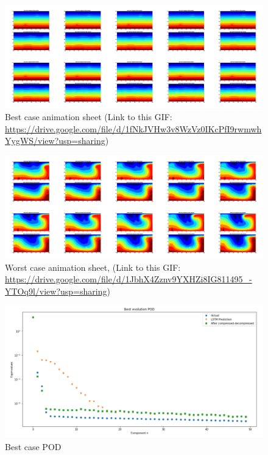 \begin{figure}[H]
    \centering
    \caption{Best case animation sheet (Link to this GIF: \url{https://drive.google.com/file/d/1fNkJVHw3v8WzVz0IKcPfI9rwmwhYygWS/view?usp=sharing})}
    \includegraphics[scale=0.10]{Report LaTeX/figures/mantle_convection_images/larger_dataset_interpolated/LSTM_Best_GIF_sheet.png}
\end{figure}



\begin{figure}[H]
    \centering
    \caption{Worst case animation sheet, (Link to this GIF: 
    \url{https://drive.google.com/file/d/1JbhX4Zznv9YXHZi8IG811495_-YTOq9l/view?usp=sharing})}
    \includegraphics[scale=0.10]{Report LaTeX/figures/mantle_convection_images/larger_dataset_interpolated/LSTM_Worst_GIF_sheet.png}
\end{figure}


\begin{figure}[H]
    \caption{Best case POD}
    \includegraphics[scale=0.5]{Report LaTeX/figures/mantle_convection_images/larger_dataset_interpolated/LSTM_Best_POD.png}
\end{figure}

